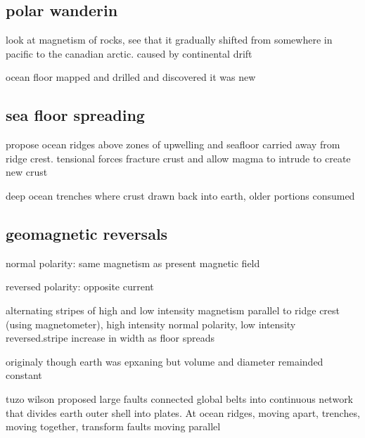 \documentclass[11pt]{amsart}
\begin{document}
  \subsection{polar wanderin}
  \par look at magnetism of rocks, see that it gradually shifted from somewhere
  in pacific to the canadian arctic. caused by continental drift
  \par ocean floor mapped and drilled and discovered it was new
  \subsection {sea floor spreading}
  \par propose ocean ridges above zones of upwelling and seafloor carried away
  from ridge crest. tensional forces fracture crust and allow magma to intrude
  to create new crust
  \par deep ocean trenches where crust drawn back into earth, older portions
  consumed
  \subsection{geomagnetic reversals}
  \par normal polarity: same magnetism as present magnetic field
  \par reversed polarity: opposite current
  \par alternating stripes of high and low intensity magnetism parallel to
  ridge crest (using magnetometer), high intensity normal polarity, low
  intensity reversed.stripe increase in width as floor spreads
  \par originaly though earth was epxaning but volume and diameter remainded
  constant
  \par tuzo wilson proposed large faults connected global belts into continuous
  network that divides earth outer shell into plates. At ocean ridges, moving
  apart, trenches, moving together, transform faults moving parallel
\end{document}
